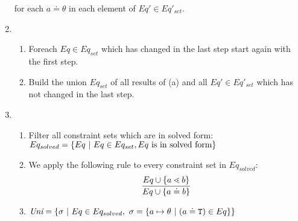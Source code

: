 \documentclass[acmsmall,screen,review]{acmart}
\begin{document}
\begin{enumerate}
      for each $a \doteq \theta$ in each element of $Eq' \in Eq'_{set}$.

\item 
    \begin{enumerate}
    \item Foreach $Eq \in Eq_{set}$ which has changed in the last step
      start again with the first step.
    \item Build the union $Eq_{set}$ of all results of (a) and all $Eq' \in
      Eq'_{set}$ which has not changed in the last step.
    \end{enumerate}
\item
\begin{enumerate}
\item Filter all constraint sets which are in solved form:\\
$Eq_{solved} = \{  Eq \ | \ Eq \in Eq_{set}, Eq \ \text{is in solved form} \}$
\item We apply the following rule to every constraint set in $Eq_{solved}$:
\begin{align*}
\ddfrac{
  Eq \cup \set{ a \lessdot b } %
}{
  Eq \cup \set{ a \doteq b }
}
\end{align*}
\item $\emph{Uni} = \{ \sigma \ | \ Eq \in Eq_{solved},\ \sigma = \{ a \mapsto \theta \ | \ (a \doteq \texttt{T}) \in Eq \}  \}$
\end{enumerate}
\end{enumerate}
\end{document}
